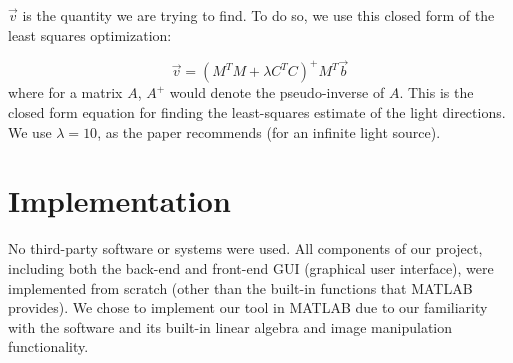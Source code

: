 \documentclass[10pt,twocolumn,letterpaper]{article}
\begin{document}
$\vec{v}$ is the quantity we are trying to find. To do so, we use this closed form of the least squares optimization:

\[\vec{v} = (M^TM + \lambda C^TC)^+M^T\vec{b}\] where for a matrix $A$, $A^+$ would denote the pseudo-inverse of $A$. This is the closed form equation for finding the least-squares estimate of the light directions. We use $\lambda = 10$, as the paper recommends (for an infinite light source).

\section{Implementation}

No third-party software or systems were used. All components of our project, including both the back-end and front-end GUI (graphical user interface), were implemented from scratch (other than the built-in functions that MATLAB provides). We chose to implement our tool in MATLAB due to our familiarity with the software and its built-in linear algebra and image manipulation functionality.
\end{document}
